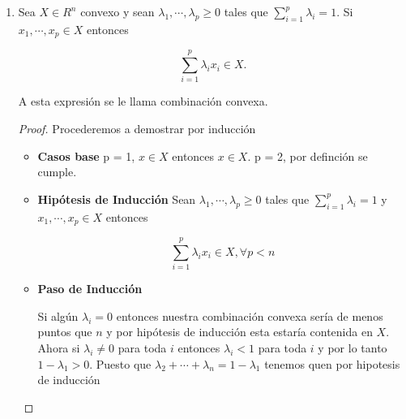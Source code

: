 \documentclass[letterpaper]{article}
\theoremstyle{definition}
\theoremstyle{lemathm}
\theoremstyle{lemathm}
\theoremstyle{lemathm}
\theoremstyle{lemademthm}
\newcommand{\pars}[1]{\left( #1 \right) }
\newcommand{\RR}{\mathbb{R}}
\newcommand{\1}{\mathbbm{1}}
\begin{document}
\begin{enumerate}
\begin{proof}
			\begin{enumerate}
				\item Por definición tenemos que $\rho\pars{\vec{x},\vec{y}} = 0$ ssi $x=y$.
				\item Por definición tenemos que $\rho\pars{\vec{x},\vec{y}} = \rho\pars{\vec{y},\vec{x}}$.
				\item Primero notemos que $\rho\pars{\vec{x},\vec{y}} \leq 1$ para todo $\vec{x},\vec{y}\in\RR^n$ luego si al menos dos vectores de $\vec{x},\vec{y},\vec{z}$ son distintos entonces $\rho\pars{\vec{x},\vec{z}} + \rho\pars{\vec{z},\vec{y}} \geq 1$ y por lo tanto $\rho\pars{\vec{x},\vec{y}} \leq \rho\pars{\vec{x},\vec{z}} + \rho\pars{\vec{z},\vec{y}}$, si todo son iguales entonces $\rho\pars{\vec{x},\vec{y}} = 0 = 0 + 0 = \rho\pars{\vec{x},\vec{z}} + \rho\pars{\vec{z},\vec{y}}$, por lo tanto se cumple el 3er axioma.
			\end{enumerate}

			Concluimos que $\rho$ es métrica.
			
		\end{proof}

		Todo conjunto $A$ es abierto puesto que para todo punto $a\in A$ es punto interior de este ya que tenemos que para todo $0<r<1$ la $B_r(a) = {a}\subset A$.

		\item Sea $X \in R^n$ convexo y sean $\lambda_1,\cdots,\lambda_p \geq 0$ tales que $\sum_{i=1}^p \lambda_i = 1$. Si $x_1,\cdots,x_p \in X$ entonces
		
		\[\sum_{i=1}^p \lambda_ix_i \in X.\]

		A esta expresión se le llama combinación convexa.

		\begin{proof}
			Procederemos a demostrar por inducción

			\begin{itemize}
				\item \textbf{Casos base} p = 1, $x\in X$ entonces $x\in X$. p = 2, por definción se cumple.
				\item \textbf{Hipótesis de Inducción}
				Sean $\lambda_1,\cdots,\lambda_p \geq 0$ tales que $\sum_{i=1}^p \lambda_i = 1$ y $x_1,\cdots,x_p \in X$ entonces
		
				\[\sum_{i=1}^p \lambda_ix_i \in X, \forall p < n\]
				\item \textbf{Paso de Inducción}
				
				Si algún $\lambda_i = 0$ entonces nuestra combinación convexa sería de menos puntos que $n$ y por hipótesis de inducción esta estaría contenida en $X$. Ahora si $\lambda_i \neq 0$ para toda $i$ entonces $\lambda_i < 1$ para toda $i$ y por lo tanto $1 - \lambda_1 > 0$. Puesto que $\lambda_2+\cdots+\lambda_n = 1 - \lambda_1$ tenemos quen por hipotesis de inducción


\end{itemize}
\end{proof}
\end{enumerate}
\end{document}
